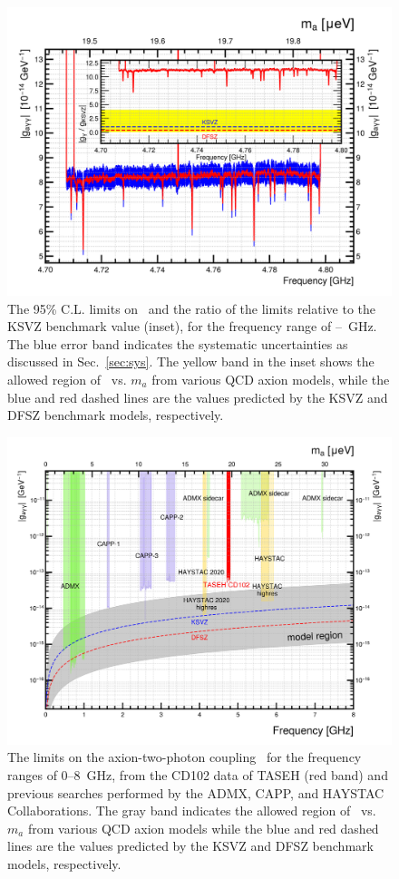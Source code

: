 \begin{figure} [htbp]
  \centering
  \includegraphics[width=12.9cm]{figures/TASEHonly_limits.png}
  \caption{The 95\% C.L. limits on \gagg\ and the ratio of the 
 limits relative to the KSVZ benchmark value  
  (inset), for the frequency range of 
\flo--\fhi~GHz. The blue error band indicates the systematic 
  uncertainties as discussed in Sec.~\ref{sec:sys}. The yellow 
 band in the inset shows the allowed region of \gagg\ vs. $m_a$ 
 from various QCD axion models, while the blue and red dashed lines are the 
values predicted by the KSVZ and DFSZ benchmark models, respectively.}
  \label{fig:glimit}
\end{figure}


\begin{figure} [htbp]
  \centering
 \includegraphics[width=12.9cm]{figures/RealData_limit_allexp.png}
  \caption{The limits on the axion-two-photon coupling \gagg\ for the 
frequency ranges of 0--8~GHz, from the CD102 data of TASEH (red band) and 
previous 
searches performed by the ADMX, CAPP, and HAYSTAC Collaborations. The gray 
band indicates the allowed region of \gagg\ vs. $m_a$ from various QCD axion 
models while the blue and red dashed lines are the values predicted by the 
KSVZ and DFSZ benchmark models, respectively.}
  \label{fig:gaggall}
\end{figure}


